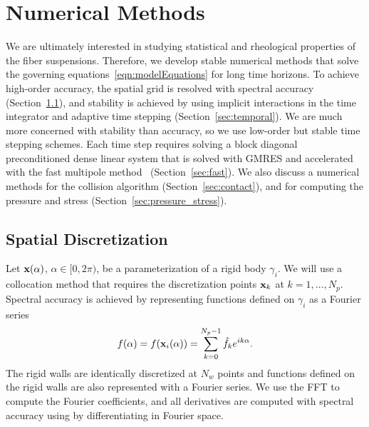 \documentclass[preprint, 10pt]{elsarticle}
\begin{document}
\section{Numerical Methods\label{s:method}} 
We are ultimately interested in studying statistical and rheological
properties of the fiber suspensions.  Therefore, we develop stable
numerical methods that solve the governing
equations~\eqref{eqn:modelEquations} for long time horizons.  To achieve
high-order accuracy, the spatial grid is resolved with spectral accuracy
(Section~\ref{sec:spatial}), and stability is achieved by using implicit
interactions in the time integrator and adaptive time stepping
(Section~\ref{sec:temporal}).  We are much more concerned with stability
than accuracy, so we use low-order but stable time stepping schemes.
Each time step requires solving a block diagonal preconditioned dense
linear system that is solved with GMRES and accelerated with the fast
multipole method~\cite{Greenbaum1992} (Section~\ref{sec:fast}).  We also
discuss a numerical methods for the collision algorithm
(Section~\ref{sec:contact}), and for computing the pressure and stress
(Section~\ref{sec:pressure_stress}).


\subsection{Spatial Discretization}\label{sec:spatial}
Let ${\mathbf{x}}(\alpha)$, $\alpha \in [0,2\pi)$, be a parameterization of a
rigid body $\gamma_i$.  We will use a collocation method that requires
the discretization points ${\mathbf{x}}_k$ at $k=1,\ldots,N_p$.  Spectral
accuracy is achieved by representing functions defined on $\gamma_i$ as
a Fourier series
\begin{align}
  f(\alpha) = f({\mathbf{x}}_i(\alpha)) = 
    \sum_{k = 0}^{N_p-1} \hat{f}_k e^{ik\alpha}.
\end{align}
The rigid walls are identically discretized at $N_w$ points and
functions defined on the rigid walls are also represented with a Fourier
series.  We use the FFT to compute the Fourier coefficients, and all
derivatives are computed with spectral accuracy using by differentiating
in Fourier space.
\end{document}
